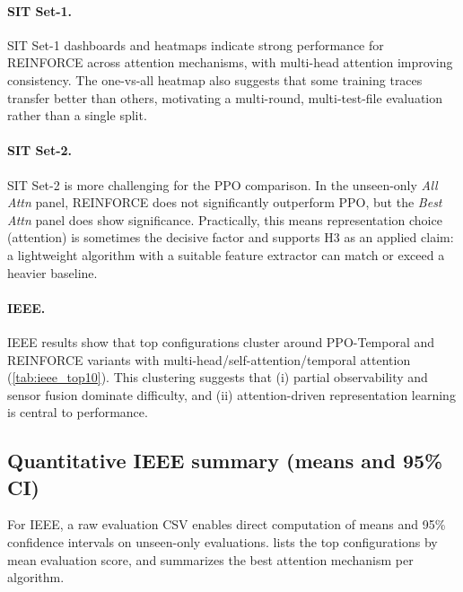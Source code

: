 \documentclass[11pt]{article}
\newcommand{\autorlTableRoot}{tables}
\renewcommand{\autorlTableRoot}{paper/tables}%
\begin{document}
\paragraph{SIT Set-1.}
SIT Set-1 dashboards and heatmaps indicate strong performance for REINFORCE across attention mechanisms, with multi-head attention improving consistency. The one-vs-all heatmap also suggests that some training traces transfer better than others, motivating a multi-round, multi-test-file evaluation rather than a single split.

\paragraph{SIT Set-2.}
SIT Set-2 is more challenging for the PPO comparison. In the unseen-only \emph{All Attn} panel, REINFORCE does not significantly outperform PPO, but the \emph{Best Attn} panel does show significance. Practically, this means representation choice (attention) is sometimes the decisive factor and supports H3 as an applied claim: a lightweight algorithm with a suitable feature extractor can match or exceed a heavier baseline.

\paragraph{IEEE.}
IEEE results show that top configurations cluster around PPO-Temporal and REINFORCE variants with multi-head/self-attention/temporal attention (\cref{tab:ieee_top10}). This clustering suggests that (i) partial observability and sensor fusion dominate difficulty, and (ii) attention-driven representation learning is central to performance.

\subsection{Quantitative IEEE summary (means and 95\% CI)}
\label{sec:ieee_summary}
For IEEE, a raw evaluation CSV enables direct computation of means and 95\% confidence intervals on unseen-only evaluations.  lists the top configurations by mean evaluation score, and  summarizes the best attention mechanism per algorithm.

\begin{table}[t]
	\centering
	\caption{Top IEEE configurations on unseen-only evaluations (mean and 95\% CI, aggregated across rounds and test files). Numbers are rounded to three decimals.}
	\label{tab:ieee_top10}
	
\end{table}
\end{document}
